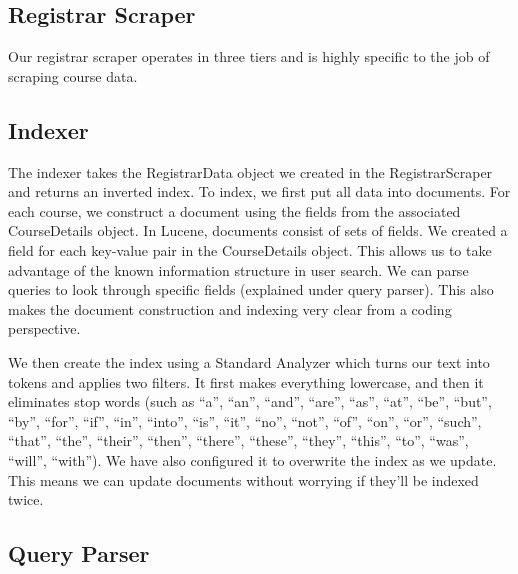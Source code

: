 \documentclass[12pt,letterpaper]{article}
\begin{document}
\subsection{Registrar Scraper}
Our registrar scraper operates in three tiers and is highly specific to the job of scraping course data. 

\subsection{Indexer}
	
The indexer takes the RegistrarData object we created in the RegistrarScraper and returns an inverted index. To index, we first put all data into documents. For each course, we construct a document using the fields from the associated CourseDetails object. In Lucene, documents consist of sets of fields. We created a field for each key-value pair in the CourseDetails object. This allows us to take advantage of the known information structure in user search. We can parse queries to look through specific fields (explained under query parser). This also makes the document construction and indexing very clear from a coding perspective. 

We then create the index using a Standard Analyzer which turns our text into tokens and applies two filters. It first makes everything lowercase, and then it eliminates stop words (such as ``a'', ``an'',  ``and'', ``are'', ``as'', ``at'', ``be'', ``but'', ``by'', ``for'', ``if'', ``in'', ``into'', ``is'', ``it'', ``no'', ``not'', ``of'', ``on'', ``or'', ``such'', ``that'', ``the'', ``their'', ``then'', ``there'', ``these'', ``they'', ``this'', ``to'', ``was'', ``will'', ``with''). We have also configured it to overwrite the index as we update. This means we can update documents without worrying if they'll be indexed twice. 
	
\subsection{Query Parser}
	
\end{document}
